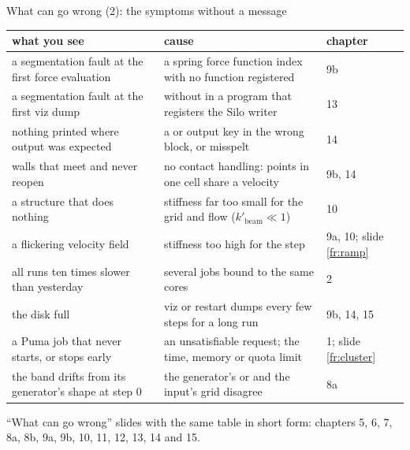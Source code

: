 \documentclass[aspectratio=169,11pt]{beamer}
\begin{document}
\begin{frame}{What can go wrong (2): the symptoms without a message}
\label{fr:table2}
\scriptsize
\setlength{\tabcolsep}{3pt}
\begin{tabular}{@{}L{0.3\textwidth}L{0.4\textwidth}L{0.26\textwidth}@{}}
\toprule
what you see & cause & chapter\\
\midrule
a segmentation fault at the first force evaluation & a spring force function index with no function registered & 9b\\
a segmentation fault at the first viz dump &  without  in a program that registers the Silo writer & 13\\
nothing printed where output was expected & a  or output key in the wrong block, or misspelt & 14\\
walls that meet and never reopen & no contact handling: points in one cell share a velocity & 9b, 14\\
a structure that does nothing & stiffness far too small for the grid and flow ($k'_{\mathrm{beam}} \ll 1$) & 10\\
a flickering velocity field & stiffness too high for the step & 9a, 10; slide \ref{fr:ramp}\\
all runs ten times slower than yesterday & several  jobs bound to the same cores & 2\\
the disk full & viz or restart dumps every few steps for a long run & 9b, 14, 15\\
a Puma job that never starts, or stops early & an unsatisfiable request; the time, memory or quota limit & 1; slide \ref{fr:cluster}\\
the band drifts from its generator's shape at step 0 & the generator's  or  and the input's grid disagree & 8a\\
\bottomrule
\end{tabular}
\vspace{1mm}

\scriptsize ``What can go wrong'' slides with the same table in short form: chapters 5, 6, 7, 8a, 8b, 9a, 9b, 10, 11, 12, 13, 14 and 15.
\end{frame}
\end{document}
